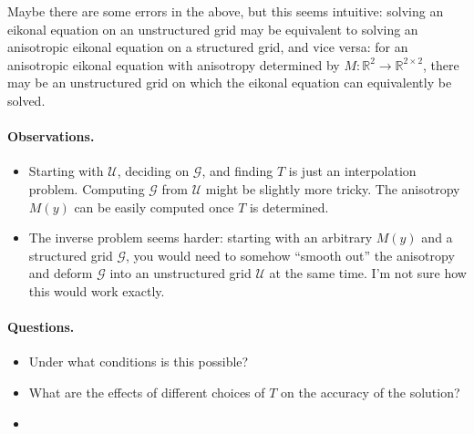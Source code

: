 \documentclass{article}
\begin{document}
Maybe there are some errors in the above, but this seems intuitive:
solving an eikonal equation on an unstructured grid may be equivalent
to solving an anisotropic eikonal equation on a structured grid, and
vice versa: for an anisotropic eikonal equation with anisotropy
determined by $M : \mathbb{R}^2 \to \mathbb{R}^{2 \times 2}$, there
may be an unstructured grid on which the eikonal equation can
equivalently be solved.

\paragraph{Observations.}

\begin{itemize}
\item Starting with $\mathcal{U}$, deciding on $\mathcal{G}$, and
  finding $T$ is just an interpolation problem. Computing
  $\mathcal{G}$ from $\mathcal{U}$ might be slightly more tricky. The
  anisotropy $M(y)$ can be easily computed once $T$ is determined.
\item The inverse problem seems harder: starting with an arbitrary
  $M(y)$ and a structured grid $\mathcal{G}$, you would need to
  somehow ``smooth out'' the anisotropy and deform $\mathcal{G}$ into
  an unstructured grid $\mathcal{U}$ at the same time. I'm not sure
  how this would work exactly.
\end{itemize}

\paragraph{Questions.}

\begin{itemize}
\item Under what conditions is this possible?
\item What are the effects of different choices of $T$ on the accuracy
  of the solution?
\item 
\end{itemize}
\end{document}
